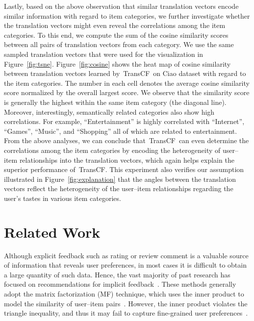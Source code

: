 \documentclass[conference]{IEEEtran}
\newcommand{\propose}{\textsf{{TransCF}}}
\begin{document}
Lastly, based on the above observation that similar translation vectors encode similar information with regard to item categories,
we further investigate whether the translation vectors might even reveal the correlations among the item categories.
To this end, 
we compute the sum of the cosine similarity scores between all pairs of translation vectors from each category. 
We use the same sampled translation vectors that were used for the visualization in Figure~\ref{fig:tsne}.
Figure~\ref{fig:cosine} shows the heat map of cosine similarity between translation vectors learned by~\propose~on Ciao dataset with regard to the item categories. The number in each cell denotes the average cosine similarity score normalized by the overall largest score.
We observe that the similarity score is generally the highest within the same item category (the diagonal line). Moreover, interestingly, semantically related categories also show high correlations. For example, ``Entertainment'' is highly correlated with ``Internet'', ``Games'', ``Music'', and ``Shopping'' all of which are related to entertainment.
From the above analyses, we can conclude that~\propose~can even determine the correlations among the item categories by encoding the heterogeneity of user--item relationships into the translation vectors, which again helps explain the superior performance of~\propose. 
This experiment also verifies our assumption illustrated in Figure~\ref{fig:explanation} that the angles between the translation vectors reflect the heterogeneity of the user--item relationships regarding the user's tastes in various item categories.






\vspace{-1ex}
\section{Related Work}
Although explicit feedback such as rating or review comment is a valuable source of information that reveals user preferences, in most cases it is difficult to obtain a large quantity of such data. Hence, the vast majority of past research has focused on recommendations for implicit feedback~\cite{weston2011wsabie,pan2013gbpr,lee2014local,johnson2014logistic,rendle2009bpr,pan2008one,he2016fast,he2016vbpr}. These methods generally adopt the matrix factorization (MF) technique, which uses the inner product to model the similarity of user--item pairs~\cite{koren2008factorization}. However, the inner product violates the triangle inequality, and thus it may fail to capture fine-grained user preferences~\cite{hsieh2017collaborative}. 
\end{document}
